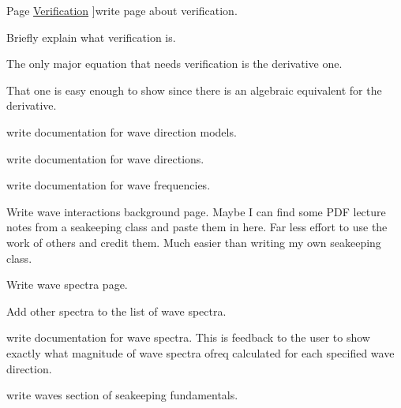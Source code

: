 \begin{DoxyRefList}
\hypertarget{todo__todo000045}{}%
Page \hyperlink{verification}{Verification} ]write page about verification.
\begin{DoxyItemize}
\item Briefly explain what verification is.
\item The only major equation that needs verification is the derivative one.
\begin{DoxyItemize}
\item That one is easy enough to show since there is an algebraic equivalent for the derivative. 
\end{DoxyItemize}
\end{DoxyItemize}
\item[\label{todo__todo000031}%
\hypertarget{todo__todo000031}{}%
Page \hyperlink{wave_direction_models}{Wave Direction Models} ]write documentation for wave direction models. 
\item[\label{todo__todo000025}%
\hypertarget{todo__todo000025}{}%
Page \hyperlink{wave_directions}{Wave Directions} ]write documentation for wave directions.  
\item[\label{todo__todo000026}%
\hypertarget{todo__todo000026}{}%
Page \hyperlink{wave_frequencies}{Wave Frequencies} ]write documentation for wave frequencies.  
\item[\label{todo__todo000042}%
\hypertarget{todo__todo000042}{}%
Page \hyperlink{wave_interactions_with_bodies}{Wave Interactions with Bodies} ]Write wave interactions background page. Maybe I can find some P\-D\-F lecture notes from a seakeeping class and paste them in here. Far less effort to use the work of others and credit them. Much easier than writing my own seakeeping class. 
\item[\label{todo__todo000036}%
\hypertarget{todo__todo000036}{}%
Page \hyperlink{wave_spectra}{Wave Spectra} ]Write wave spectra page.

Add other spectra to the list of wave spectra. 
\item[\label{todo__todo000027}%
\hypertarget{todo__todo000027}{}%
Page \hyperlink{output_wave_spectra}{Wave Spectra} ]write documentation for wave spectra. This is feedback to the user to show exactly what magnitude of wave spectra ofreq calculated for each specified wave direction. 
\item[\label{todo__todo000043}%
\hypertarget{todo__todo000043}{}%
Page \hyperlink{waves}{Waves} ]write waves section of seakeeping fundamentals.
\end{DoxyRefList}